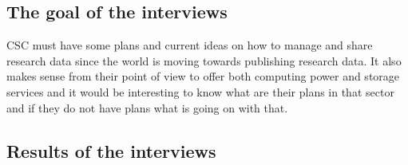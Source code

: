 \subsection{The goal of the interviews}

CSC must have some plans and current ideas on how to manage and share research
data since the world is moving towards publishing research data. It also makes
sense from their point of view to offer both computing power and storage
services and it would be interesting to know what are their plans in that
sector and if they do not have plans what is going on with that.

\subsection{Results of the interviews}

